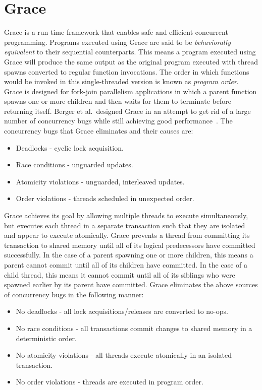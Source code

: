 \section{Grace}

Grace is a run-time framework that enables safe and efficient
concurrent programming.  Programs executed using Grace are said to be
\emph{behaviorally equivalent} to their sequential counterparts.  This
means a program executed using Grace will produce the same output as
the original program executed with thread spawns converted to regular
function invocations.  The order in which functions would be invoked
in this single-threaded version is known as \emph{program order}.
Grace is designed for fork-join parallelism applications in which a
parent function spawns one or more children and then waits for them to
terminate before returning itself.  Berger et al.\ designed Grace in
an attempt to get rid of a large number of concurrency bugs while
still achieving good performance~\cite{grace}.  The concurrency bugs
that Grace eliminates and their causes are:

\begin{itemize}
\item Deadlocks - cyclic lock acquisition.

\item Race conditions - unguarded updates.

\item Atomicity violations - unguarded, interleaved updates.

\item Order violations - threads scheduled in unexpected order.
\end{itemize}

Grace achieves its goal by allowing multiple threads to execute
simultaneously, but executes each thread in a separate transaction
such that they are isolated and appear to execute atomically.  Grace
prevents a thread from committing its transaction to shared memory
until all of its logical predecessors have committed successfully.  In
the case of a parent spawning one or more children, this means a
parent cannot commit until all of its children have committed.  In the
case of a child thread, this means it cannot commit until all of its
siblings who were spawned earlier by its parent have committed.  Grace
eliminates the above sources of concurrency bugs in the following
manner:

\begin{itemize}
\item No deadlocks - all lock acquisitions/releases are converted to
  no-ops.

\item No race conditions - all transactions commit changes to shared
  memory in a deterministic order.

\item No atomicity violations - all threads execute atomically in an
  isolated transaction.

\item No order violations - threads are executed in program order.
\end{itemize}

